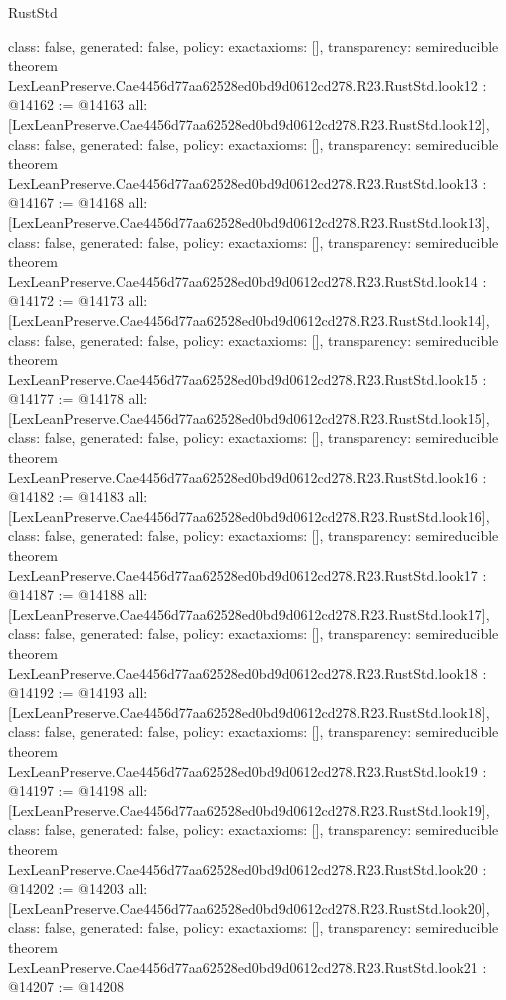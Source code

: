 \begin{lexlean}{RustStd}
\begin{coremodule}
{  class: false,
  generated: false,
  policy: exact{axioms: []},
  transparency: semireducible
}
theorem LexLeanPreserve.Cae4456d77aa62528ed0bd9d0612cd278.R23.RustStd.look12 : @14162 := @14163 {
  all: [LexLeanPreserve.Cae4456d77aa62528ed0bd9d0612cd278.R23.RustStd.look12],
  class: false,
  generated: false,
  policy: exact{axioms: []},
  transparency: semireducible
}
theorem LexLeanPreserve.Cae4456d77aa62528ed0bd9d0612cd278.R23.RustStd.look13 : @14167 := @14168 {
  all: [LexLeanPreserve.Cae4456d77aa62528ed0bd9d0612cd278.R23.RustStd.look13],
  class: false,
  generated: false,
  policy: exact{axioms: []},
  transparency: semireducible
}
theorem LexLeanPreserve.Cae4456d77aa62528ed0bd9d0612cd278.R23.RustStd.look14 : @14172 := @14173 {
  all: [LexLeanPreserve.Cae4456d77aa62528ed0bd9d0612cd278.R23.RustStd.look14],
  class: false,
  generated: false,
  policy: exact{axioms: []},
  transparency: semireducible
}
theorem LexLeanPreserve.Cae4456d77aa62528ed0bd9d0612cd278.R23.RustStd.look15 : @14177 := @14178 {
  all: [LexLeanPreserve.Cae4456d77aa62528ed0bd9d0612cd278.R23.RustStd.look15],
  class: false,
  generated: false,
  policy: exact{axioms: []},
  transparency: semireducible
}
theorem LexLeanPreserve.Cae4456d77aa62528ed0bd9d0612cd278.R23.RustStd.look16 : @14182 := @14183 {
  all: [LexLeanPreserve.Cae4456d77aa62528ed0bd9d0612cd278.R23.RustStd.look16],
  class: false,
  generated: false,
  policy: exact{axioms: []},
  transparency: semireducible
}
theorem LexLeanPreserve.Cae4456d77aa62528ed0bd9d0612cd278.R23.RustStd.look17 : @14187 := @14188 {
  all: [LexLeanPreserve.Cae4456d77aa62528ed0bd9d0612cd278.R23.RustStd.look17],
  class: false,
  generated: false,
  policy: exact{axioms: []},
  transparency: semireducible
}
theorem LexLeanPreserve.Cae4456d77aa62528ed0bd9d0612cd278.R23.RustStd.look18 : @14192 := @14193 {
  all: [LexLeanPreserve.Cae4456d77aa62528ed0bd9d0612cd278.R23.RustStd.look18],
  class: false,
  generated: false,
  policy: exact{axioms: []},
  transparency: semireducible
}
theorem LexLeanPreserve.Cae4456d77aa62528ed0bd9d0612cd278.R23.RustStd.look19 : @14197 := @14198 {
  all: [LexLeanPreserve.Cae4456d77aa62528ed0bd9d0612cd278.R23.RustStd.look19],
  class: false,
  generated: false,
  policy: exact{axioms: []},
  transparency: semireducible
}
theorem LexLeanPreserve.Cae4456d77aa62528ed0bd9d0612cd278.R23.RustStd.look20 : @14202 := @14203 {
  all: [LexLeanPreserve.Cae4456d77aa62528ed0bd9d0612cd278.R23.RustStd.look20],
  class: false,
  generated: false,
  policy: exact{axioms: []},
  transparency: semireducible
}
theorem LexLeanPreserve.Cae4456d77aa62528ed0bd9d0612cd278.R23.RustStd.look21 : @14207 := @14208 {
}
\end{coremodule}
\end{lexlean}
